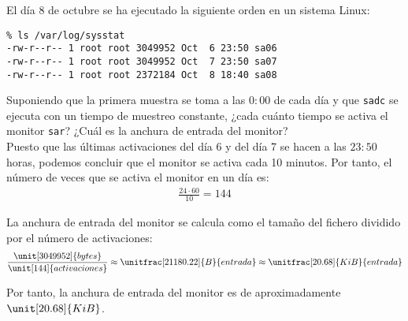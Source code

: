\begin{ejercicio}
    El día 8 de octubre se ha ejecutado la siguiente orden en un sistema Linux:
    \begin{verbatim}
% ls /var/log/sysstat
-rw-r--r-- 1 root root 3049952 Oct  6 23:50 sa06
-rw-r--r-- 1 root root 3049952 Oct  7 23:50 sa07
-rw-r--r-- 1 root root 2372184 Oct  8 18:40 sa08
    \end{verbatim}

    Suponiendo que la primera muestra se toma a las $0:00$ de cada día y que \verb|sadc| se ejecuta con un tiempo de muestreo constante, ¿cada cuánto tiempo se activa el monitor \verb|sar|? ¿Cuál es la anchura de entrada del monitor?\\

    Puesto que las últimas activaciones del día 6 y del día 7 se hacen a las $23:50$ horas, podemos concluir que el monitor se activa cada 10 minutos. Por tanto, el número de veces que se activa el monitor en un día es:
    \begin{align*}
        \frac{24\cdot 60}{10} = 144
    \end{align*}

    La anchura de entrada del monitor se calcula como el tamaño del fichero dividido por el número de activaciones:
    \begin{align*}
        \frac{\unit[3049952]{bytes}}{\unit[144]{activaciones}} \approx \unitfrac[21180.22]{B}{entrada}
        \approx \unitfrac[20.68]{KiB}{entrada}
    \end{align*}

    Por tanto, la anchura de entrada del monitor es de aproximadamente $\unit[20.68]{KiB}$.
\end{ejercicio}
\begin{comment}
    Solución: El monitor se activa cada 10 minutos (la última activación del día se hace a las $23:50$ horas). La información generada en cada activación (anchura de entrada) ocupa aproximadamente 20,7 KiB o 21,2 KB.
\end{comment}

